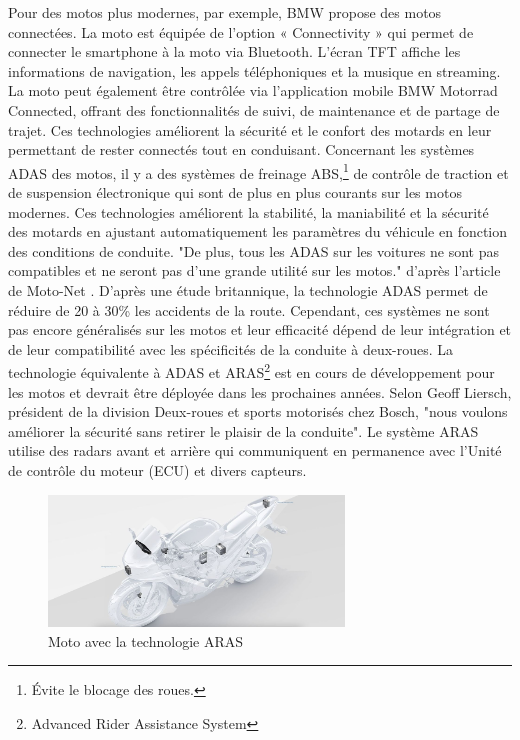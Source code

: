 \documentclass{article}
\begin{document}
Pour des motos plus modernes, par exemple, BMW propose des motos connectées\cite{bmw_adas}. La moto est équipée de l’option « Connectivity » qui permet de connecter le smartphone à la moto via Bluetooth. L’écran TFT affiche les informations de navigation, les appels téléphoniques et la musique en streaming. La moto peut également être contrôlée via l’application mobile BMW Motorrad Connected, offrant des fonctionnalités de suivi, de maintenance et de partage de trajet. Ces technologies améliorent la sécurité et le confort des motards en leur permettant de rester connectés tout en conduisant.
Concernant les systèmes ADAS des motos\cite{moto_adas}, il y a des systèmes de freinage ABS,\footnote{Évite le blocage des roues.} de contrôle de traction et de suspension électronique qui sont de plus en plus courants sur les motos modernes. Ces technologies améliorent la stabilité, la maniabilité et la sécurité des motards en ajustant automatiquement les paramètres du véhicule en fonction des conditions de conduite. "De plus, tous les ADAS sur les voitures ne sont pas compatibles et ne seront pas d’une grande utilité sur les motos." d'après l'article de Moto-Net \cite{moto_adas}.
D'après une étude britannique, la technologie ADAS permet de réduire de 20 à 30\%\cite{moto_aras} les accidents de la route. Cependant, ces systèmes ne sont pas encore généralisés sur les motos et leur efficacité dépend de leur intégration et de leur compatibilité avec les spécificités de la conduite à deux-roues. La technologie équivalente à ADAS et ARAS\footnote{Advanced Rider Assistance System} est en cours de développement pour les motos et devrait être déployée dans les prochaines années.
Selon Geoff Liersch, président de la division Deux-roues et sports motorisés chez Bosch, "nous voulons améliorer la sécurité sans retirer le plaisir de la conduite"\cite{aras_bosh}.
Le système ARAS utilise des radars avant et arrière qui communiquent en permanence avec l’Unité de contrôle du moteur (ECU) et divers capteurs.

\begin{figure}[H]
    \centering
    \includegraphics[width=0.7\textwidth]{images/aras_moto.jpeg} 
    \caption{Moto avec la technologie ARAS}
\end{figure}
\end{document}
